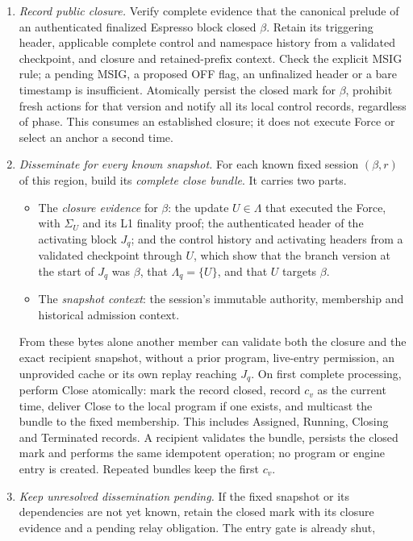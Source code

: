 \documentclass[11pt,a4paper]{article}
\newcommand{\defterm}[1]{\textcolor{rrBlue}{\textit{#1}}}
\begin{document}
\begin{enumerate}[label=(\roman*),itemsep=2pt]
\item \emph{Record public closure.} Verify complete evidence that the
canonical prelude of an authenticated finalized Espresso block closed
$\beta$. Retain its triggering header, applicable complete control and
namespace history from a validated checkpoint, and closure and
retained-prefix context. Check the explicit MSIG rule; a pending
MSIG, a proposed OFF flag, an unfinalized header or a bare timestamp is insufficient.
Atomically persist the closed mark for $\beta$, prohibit fresh actions for
that version and notify all its local control records, regardless of
phase. This consumes an established closure; it does not execute Force
or select an anchor a second time.
\item \emph{Disseminate for every known snapshot.} For each known fixed
session $(\beta,r)$ of this region, build its \defterm{complete close
bundle}. It carries two parts.
 \begin{itemize}
 \item The \emph{closure evidence} for $\beta$: the update $U\in\Lambda$
 that executed the Force, with $\Sigma_U$ and its L1 finality proof; the
 authenticated header of the activating block $J_q$; and the control
 history and activating headers from a validated checkpoint through
 $U$, which show that the branch version at the start of $J_q$ was
 $\beta$, that $\Lambda_q=\{U\}$, and that $U$ targets $\beta$.
 \item The \emph{snapshot context}: the session's immutable authority,
 membership and historical admission context.
 \end{itemize}
From these bytes alone another member can validate both the closure and
the exact recipient snapshot, without a prior program, live-entry
permission, an unprovided cache or its own replay reaching $J_q$. On first complete
processing, perform Close atomically: mark the record closed, record
$c_v$ as the current time, deliver Close to the local program if one
exists, and multicast the bundle to the fixed membership. This includes
Assigned, Running, Closing and Terminated records. A recipient validates
the bundle, persists the closed mark and performs the same idempotent operation;
no program or engine entry is created. Repeated bundles keep the first $c_v$.
\item \emph{Keep unresolved dissemination pending.} If the fixed snapshot or
its dependencies are not yet known, retain the closed mark with its
closure evidence and a pending relay obligation. The entry gate is already shut,

\end{enumerate}
\end{document}
